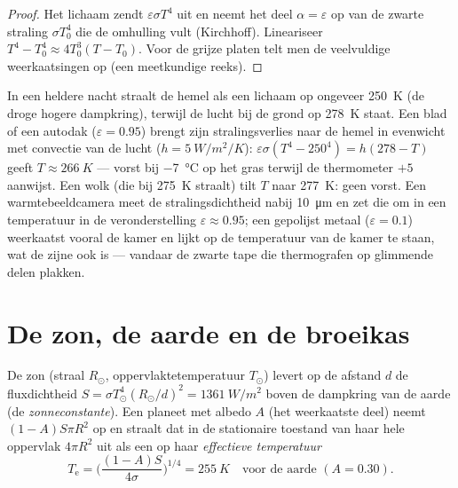 \begin{proof}
Het lichaam zendt $\varepsilon\sigma T^4$ uit en neemt het deel
$\alpha =
\varepsilon$ op van de zwarte straling $\sigma T_0^4$ die de
omhulling vult
(Kirchhoff). Lineariseer $T^4 - T_0^4 \approx 4T_0^3(T - T_0)$. Voor de
grijze platen telt men de veelvuldige weerkaatsingen op (een meetkundige reeks).
\end{proof}

\begin{example}\label{ex:b2:thermal-radiation:frost}
In een heldere nacht straalt de hemel als een lichaam op ongeveer \qty{250}{K}
(de droge hogere dampkring), terwijl de lucht bij de grond op
\qty{278}{K} staat. Een blad of een autodak ($\varepsilon = 0.95$) brengt zijn
stralingsverlies naar de hemel in evenwicht met convectie van de lucht
($h =
\qty{5}{W/m^2/K}$): $\varepsilon\sigma(T^4 - 250^4) = h(278 - T)$
geeft $T
\approx \qty{266}{K}$ --- vorst bij \qty{-7}{\celsius} op het gras
terwijl
de thermometer $+5$ aanwijst. Een wolk (die bij \qty{275}{K} straalt) tilt $T$
naar \qty{277}{K}: geen vorst. Een warmtebeeldcamera meet de
stralingsdichtheid nabij
\qty{10}{\micro m} en zet die om in een temperatuur in de veronderstelling
$\varepsilon \approx 0.95$; een gepolijst metaal ($\varepsilon = 0.1$) weerkaatst
vooral de kamer en lijkt op de temperatuur van de kamer te staan, wat de
zijne ook is
--- vandaar de zwarte tape die thermografen op glimmende delen plakken.
\end{example}

\section{De zon, de aarde en de broeikas}

\begin{proposition}\label{prop:b2:thermal-radiation:earth}
De zon (straal $R_\odot$, oppervlaktetemperatuur $T_\odot$) levert op de
afstand $d$ de fluxdichtheid
$S = \sigma T_\odot^4 (R_\odot/d)^2 =
\qty{1361}{W/m^2}$ boven de dampkring
van de aarde (de \emph{zonneconstante}). Een planeet met albedo $A$ (het weerkaatste
deel) neemt $(1 - A)S\pi R^2$ op en straalt dat in de stationaire toestand
van haar hele oppervlak $4\pi R^2$ uit als een  op haar
\emph{effectieve
temperatuur}
\[
T_{\text{e}} = \Big(\frac{(1 - A)S}{4\sigma}\Big)^{1/4} = \qty{255}{K}
\quad\text{voor de aarde } (A = 0.30) .
\]
\end{proposition}

